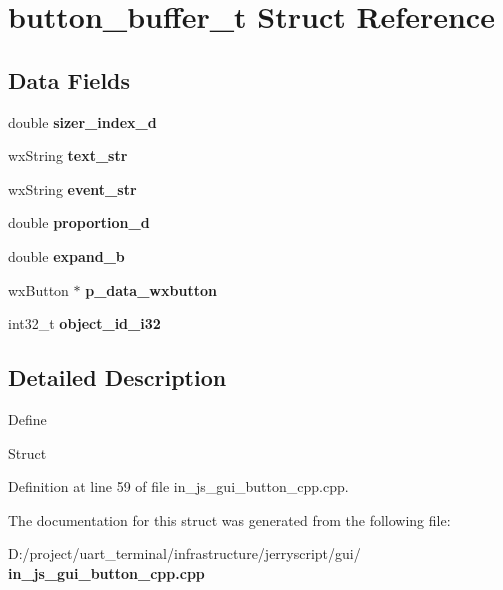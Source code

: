 \section{button\+\_\+buffer\+\_\+t Struct Reference}
\label{structbutton__buffer__t}
\subsection*{Data Fields}
\begin{DoxyCompactItemize}
\item 
\mbox{\label{structbutton__buffer__t_aae99f717aadbf88f890c71a293468af8}} 
double {\bfseries sizer\+\_\+index\+\_\+d}
\item 
\mbox{\label{structbutton__buffer__t_ae027b01a16a8b9ded760f0ead4d7a951}} 
wx\+String {\bfseries text\+\_\+str}
\item 
\mbox{\label{structbutton__buffer__t_a43aba9d4f0f518678c2dd03b5bfd9e7e}} 
wx\+String {\bfseries event\+\_\+str}
\item 
\mbox{\label{structbutton__buffer__t_a93e3ac3895fbb25863fb66af78e0ed39}} 
double {\bfseries proportion\+\_\+d}
\item 
\mbox{\label{structbutton__buffer__t_a40506be5f1249944fed816e11465f5ca}} 
double {\bfseries expand\+\_\+b}
\item 
\mbox{\label{structbutton__buffer__t_aee48a11d69f9dacba25d92b60ae86d63}} 
wx\+Button $\ast$ {\bfseries p\+\_\+data\+\_\+wxbutton}
\item 
\mbox{\label{structbutton__buffer__t_aa7683407966206b7eb17d410ee75d880}} 
int32\+\_\+t {\bfseries object\+\_\+id\+\_\+i32}
\end{DoxyCompactItemize}


\subsection{Detailed Description}
Define

Struct 

Definition at line 59 of file in\+\_\+js\+\_\+gui\+\_\+button\+\_\+cpp.\+cpp.



The documentation for this struct was generated from the following file\+:\begin{DoxyCompactItemize}
\item 
D\+:/project/uart\+\_\+terminal/infrastructure/jerryscript/gui/\textbf{ in\+\_\+js\+\_\+gui\+\_\+button\+\_\+cpp.\+cpp}\end{DoxyCompactItemize}
